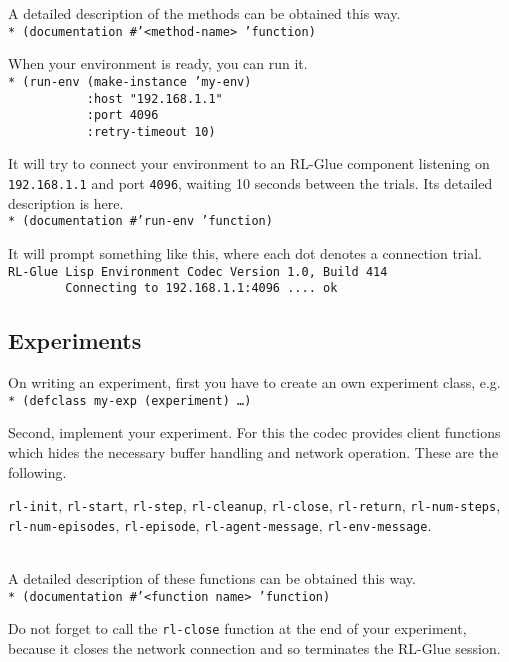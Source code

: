 \documentclass[11pt,a4paper,dvipdfm]{article}
\newcommand{\prompttext}[1]{\texttt{#1}}
\newcommand{\lispprompt}[1]{\prompttext{* #1}}
\begin{document}
A detailed description of the methods can be obtained this way. \\
\lispprompt{(documentation \#'<method-name> 'function)}

When your environment is ready, you can run it. \\
\lispprompt{(run-env (make-instance 'my-env) \\
\mbox{~~~~~~~~~~~}:host "192.168.1.1" \\
\mbox{~~~~~~~~~~~}:port 4096 \\
\mbox{~~~~~~~~~~~}:retry-timeout 10)}

It will try to connect your environment to an RL-Glue component listening on
\prompttext{192.168.1.1} and port \prompttext{4096}, waiting 10 seconds
between the trials. Its detailed description is here. \\
\lispprompt{(documentation \#'run-env 'function)}

It will prompt something like this, where each dot denotes a connection
trial. \\
\prompttext{RL-Glue Lisp Environment Codec Version 1.0, Build 414} \\
\prompttext{\mbox{~~~~~~~~}Connecting to 192.168.1.1:4096 ....~ok}

\subsection{Experiments}

On writing an experiment, first you have to create an own experiment class,
e.g. \\
\lispprompt{(defclass my-exp (experiment) \ldots)}

Second, implement your experiment. For this the codec provides client
functions which hides the necessary buffer handling and network operation.
These are the following.

\prompttext{rl-init},
\prompttext{rl-start},
\prompttext{rl-step},
\prompttext{rl-cleanup},
\prompttext{rl-close},
\prompttext{rl-return},
\prompttext{rl-num-steps}, \\
\prompttext{rl-num-episodes},
\prompttext{rl-episode},
\prompttext{rl-agent-message},
\prompttext{rl-env-message}.

\ \\
A detailed description of these functions can be obtained this way. \\
\lispprompt{(documentation \#'<function name> 'function)}

Do not forget to call the \prompttext{rl-close} function at the end of your
experiment, because it closes the network connection and so terminates the
RL-Glue session.
\end{document}
